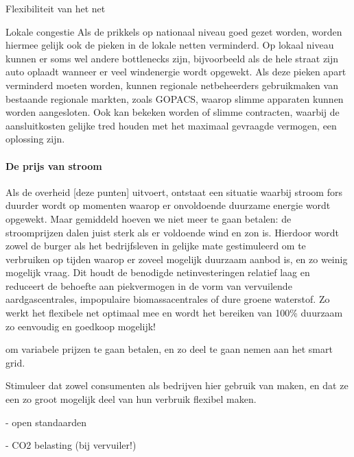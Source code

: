 \begin{voorstel}{Flexibiliteit van het net}
\begin{multicols*}{2}
\begin{overwegingen}
\begin{infobox}{Lokale congestie}
Als de prikkels op nationaal niveau goed gezet worden, worden hiermee gelijk ook de pieken in de lokale netten verminderd. Op lokaal niveau kunnen er soms wel andere bottlenecks zijn, bijvoorbeeld als de hele straat zijn auto oplaadt wanneer er veel windenergie wordt opgewekt. Als deze pieken apart verminderd moeten worden, kunnen regionale netbeheerders gebruikmaken van bestaande regionale markten, zoals GOPACS, waarop slimme apparaten kunnen worden aangesloten. Ook kan bekeken worden of slimme contracten, waarbij de aansluitkosten gelijke tred houden met het maximaal gevraagde vermogen, een oplossing zijn.
\end{infobox}

\paragraph{De prijs van stroom}
Als de overheid [deze punten] uitvoert, ontstaat een situatie waarbij stroom fors duurder wordt op momenten waarop er onvoldoende duurzame energie wordt opgewekt. Maar gemiddeld hoeven we niet meer te gaan betalen: de stroomprijzen dalen juist sterk als er voldoende wind en zon is. Hierdoor wordt zowel de burger als het bedrijfsleven in gelijke mate gestimuleerd om te verbruiken op tijden waarop er zoveel mogelijk duurzaam aanbod is, en zo weinig mogelijk vraag. Dit houdt de benodigde netinvesteringen relatief laag en reduceert de behoefte aan piekvermogen in de vorm van vervuilende aardgascentrales, impopulaire biomassacentrales of dure groene waterstof. Zo werkt het flexibele net optimaal mee en wordt het bereiken van 100\% duurzaam zo eenvoudig en goedkoop mogelijk!


\end{overwegingen}

\begin{aanbevelingen}
 om variabele prijzen te gaan betalen, en zo deel te gaan nemen aan het smart grid.

Stimuleer dat zowel consumenten als bedrijven hier gebruik van maken, en dat ze een zo groot mogelijk deel van hun verbruik flexibel maken.

- open standaarden


- CO2 belasting (bij vervuiler!)


\end{aanbevelingen}
\end{multicols*}
\end{voorstel}
